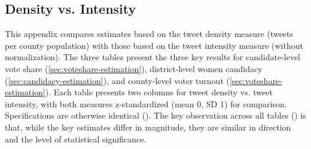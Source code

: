 \documentclass[manuscript,screen,nonacm,11pt,acm]{acmart}
\begin{document}
\begin{bibunit}
\section{Density vs. Intensity}
\label{sm:density-intensity}
This appendix compares estimates based on the tweet density measure (tweets per county population) with those based on the tweet intensity measure (without normalization).
The three tables present the three key results for candidate-level vote share (\cref{sec:voteshare-estimation}), district-level women candidacy (\cref{sec:candidacy-estimation}), and county-level voter turnout (\cref{sec:voteshare-estimation}).
Each table presents two columns for tweet density vs. tweet intensity, with both measures z-standardized (mean 0, SD 1) for comparison.
Specifications are otherwise identical ().
The key observation across all tables () is that, while the key estimates differ in magnitude, they are similar in direction and the level of statistical significance.


\end{bibunit}
\end{document}
